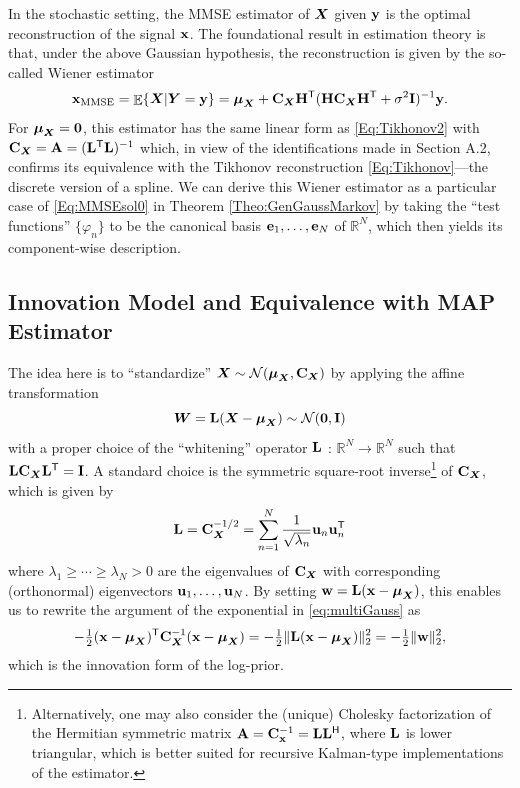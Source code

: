 \documentclass[11pt, english,english]{article}
\newcommand{\R}{ \mathbb{R}}
\def\V#1{{\boldsymbol{#1}}}         %
\def\Spc#1{{\mathcal{#1}}}  %
\def\M#1{{\bf{#1}}}  %
\def\Exp{\mathop{\mathbb{E}}\nolimits}
\renewcommand{\[}{\begin{equation}}
\renewcommand{\]}[1]{\label{eq:#1}\end{equation}}
\def\Exp{\mathop{\mathbb{E}}\nolimits}
\def\VRand#1{{\uppercase{\boldsymbol #1}}}         %
\newcommand{\Tr}{\mathsf{T}}
\newcommand{\HTop}{\mathsf{H}}
\begin{document}
In the stochastic setting,  the MMSE estimator of $\VRand X$ given $\M y$ is the optimal reconstruction of the signal $\M x$. The foundational result in estimation theory is that, under the above Gaussian hypothesis, the reconstruction is given by
the so-called Wiener estimator
\begin{align}
\label{eq:Wiener}
\M x_{\rm MMSE}=\Exp\{\VRand X|\VRand Y=\M y\}=\V \mu_{\VRand X}+\M C_{\VRand x} \M H^\Tr (\M H \M C_{\VRand x}\M H^\Tr + \sigma^2 \M I)^{-1}\M y.
\end{align}
For $\V \mu_{\VRand X}=\V 0$, this estimator has the same linear form as \eqref{Eq:Tikhonov2}
with $\M C_{\VRand x}=\M A=(\M L^\Tr \M L)^{-1}$ which, in view of the identifications made in Section A.2, confirms its equivalence with the Tikhonov reconstruction \eqref{Eq:Tikhonov}---the discrete version of a spline.
We can derive this Wiener estimator as a particular case of \eqref{Eq:MMSEsol0} in Theorem \ref{Theo:GenGaussMarkov} by taking the ``test functions'' $\{\varphi_n\}$ to be the canonical basis $\M e_1, \dots, \M e_N$ of $\R^N$, which then yields its component-wise description.
\subsection{Innovation Model and Equivalence with MAP Estimator}
\label{Sec:White}
The idea here is to ``standardize'' $\VRand x \sim \Spc N(\V \mu_{\VRand x},\M C_{\VRand x})$ by applying the affine transformation $$\VRand w=\M L (\VRand x-\V \mu_{\VRand x})\sim \Spc N(\M 0,\M I)$$ with a proper choice of the ``whitening'' operator $\M L$ : $\R^N\to\R^N$ such that $\M L \M C_{\VRand x}\M L^\Tr=\M I$. A standard choice %
is the symmetric square-root inverse\footnote{Alternatively, one may also consider the (unique) Cholesky factorization
of the Hermitian symmetric matrix $\M A=\M C_{\M x}^{-1}=\M L \M L^\HTop$, where $\M L$ is lower triangular, which is better suited for recursive Kalman-type implementations of the estimator.} of $\M C_{\VRand x}$, which is given by
$$\M L=\M C_{\VRand x}^{-1/2}=\sum_{n=1}^N \frac{1}{\sqrt{\lambda_n}} \M u_n\M u^\Tr_n$$
where $\lambda_1\ge \cdots\ge \lambda_N>0$ are the eigenvalues of $\M C_{\VRand x}$ with corresponding (orthonormal) eigenvectors $\M u_1,\dots,\M u_N$.  By setting
$\M w=\M L (\M x-\V \mu_{\VRand x})$, this enables us to rewrite the argument of the exponential in \eqref{eq:multiGauss}
 as
 \begin{align}
 \label{eq:innovalikelihood}
-\tfrac{1}{2}(\M x-\V \mu_{\VRand x})^\Tr \M C_{\VRand x}^{-1} (\M x-\V \mu_{\VRand X})=-\tfrac{1}{2}\|\M L (\M x -\V \mu_{\VRand x}) \|_2^2=-\tfrac{1}{2}\|\M w\|_2^2,
\end{align}
which is the innovation form of the log-prior. 
\end{document}
